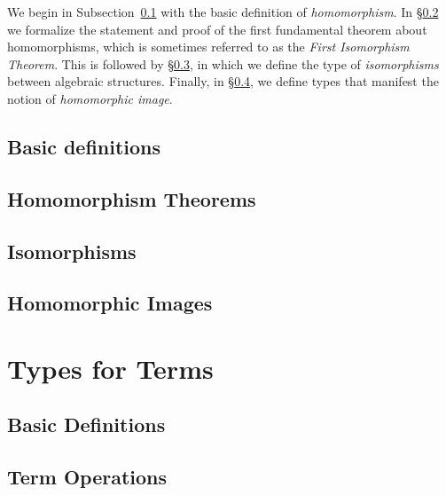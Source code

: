 \documentclass[a4paper,UKenglish,cleveref,autoref,thm-restate,12pt]{../lipics-v2021-wjd}
\begin{document}
We begin in Subsection~\ref{sec:basic-definitions} with the basic definition of \emph{homomorphism}. In \S\ref{sec:homom-theor} we formalize the statement and proof of the first fundamental theorem about homomorphisms, which is sometimes referred to as the \emph{First Isomorphism Theorem}. This is followed by \S\ref{sec:isomorphisms}, in which we define the type of \emph{isomorphisms} between algebraic structures.  Finally, in \S\ref{sec:hom-images}, we define types that manifest the notion of \emph{homomorphic image}.

\subsection{Basic definitions}\label{sec:basic-definitions}\firstsentence{\ualibHomBasic}{\urlHomBasic}

\subsection{Homomorphism Theorems}\label{sec:homom-theor}\firstsentence{\ualibNoether}{\urlNoether}
% 
\subsection{Isomorphisms}\label{sec:isomorphisms}\firstsentence{\ualibIsomorphisms}{\urlIsomorphisms}
% 
\subsection{Homomorphic Images}\label{sec:hom-images}\firstsentence{\ualibHomomorphicImages}{\urlHomomorphicImages}
% 

\section{Types for Terms}\label{sec:types-terms}
\subsection{Basic Definitions}\label{sec:types-basic-defs}\firstsentence{\ualibTermsBasic}{\urlTermsBasic}
%
\subsection{Term Operations}\label{sec:term-operations}\firstsentence{\ualibOperations}{\urlOperations}
%
\end{document}
